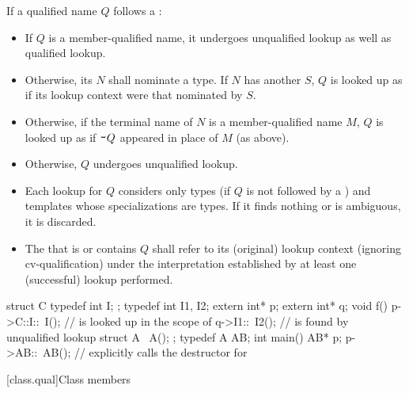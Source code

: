 \pnum
If a qualified name $Q$ follows a \tcode{\~}:
\begin{itemize}
\item
If $Q$ is a member-qualified name,
it undergoes unqualified lookup as well as qualified lookup.
\item
Otherwise, its  $N$ shall nominate a type.
If $N$ has another  $S$,
$Q$ is looked up as if its lookup context were that nominated by $S$.
\item
Otherwise, if the terminal name of $N$ is a member-qualified name $M$,
$Q$ is looked up as if $\tcode{\~}Q$ appeared in place of $M$ (as above).
\item
Otherwise, $Q$ undergoes unqualified lookup.
\item
Each lookup for $Q$ considers only
types (if $Q$ is not followed by a \tcode{<}) and
templates whose specializations are types.
If it finds nothing or is ambiguous, it is discarded.
\item
The  that is or contains $Q$
shall refer to its (original) lookup context (ignoring cv-qualification) under
the interpretation established by at least one (successful) lookup performed.
\end{itemize}
\begin{example}
\begin{codeblock}
struct C {
  typedef int I;
};
typedef int I1, I2;
extern int* p;
extern int* q;
void f() {
  p->C::I::~I();        //  is looked up in the scope of 
  q->I1::~I2();         //  is found by unqualified lookup
}
struct A {
  ~A();
};
typedef A AB;
int main() {
  AB* p;
  p->AB::~AB();         // explicitly calls the destructor for 
}
\end{codeblock}
\end{example}

[class.qual]{Class members}

%

